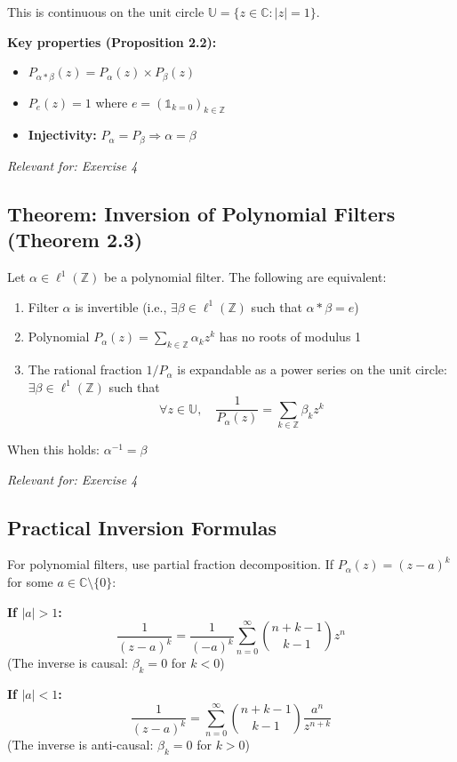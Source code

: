 \documentclass[a4paper, 12pt]{article}
\begin{document}
This is continuous on the unit circle $\mathbb{U} = \{z \in \mathbb{C}: |z|=1\}$.

\textbf{Key properties (Proposition 2.2):}
\begin{itemize}
\item $P_{\alpha*\beta}(z) = P_\alpha(z) \times P_\beta(z)$
\item $P_e(z) = 1$ where $e = (\mathbb{1}_{k=0})_{k \in \mathbb{Z}}$
\item \textbf{Injectivity:} $P_\alpha = P_\beta \Rightarrow \alpha = \beta$
\end{itemize}

\textit{Relevant for: Exercise 4}

\subsection{Theorem: Inversion of Polynomial Filters (Theorem 2.3)}
Let $\alpha \in \ell^1(\mathbb{Z})$ be a polynomial filter. The following are equivalent:
\begin{enumerate}
\item Filter $\alpha$ is invertible (i.e., $\exists \beta \in \ell^1(\mathbb{Z})$ such that $\alpha * \beta = e$)
\item Polynomial $P_\alpha(z) = \sum_{k \in \mathbb{Z}} \alpha_k z^k$ has no roots of modulus 1
\item The rational fraction $1/P_\alpha$ is expandable as a power series on the unit circle: $\exists \beta \in \ell^1(\mathbb{Z})$ such that
\[
\forall z \in \mathbb{U}, \quad \frac{1}{P_\alpha(z)} = \sum_{k \in \mathbb{Z}} \beta_k z^k
\]
\end{enumerate}

When this holds: $\alpha^{-1} = \beta$

\textit{Relevant for: Exercise 4}

\subsection{Practical Inversion Formulas}
For polynomial filters, use partial fraction decomposition. If $P_\alpha(z) = (z-a)^k$ for some $a \in \mathbb{C} \setminus \{0\}$:

\textbf{If $|a| > 1$:}
\[
\frac{1}{(z-a)^k} = \frac{1}{(-a)^k}\sum_{n=0}^\infty \binom{n+k-1}{k-1}z^n
\]
(The inverse is causal: $\beta_k = 0$ for $k < 0$)

\textbf{If $|a| < 1$:}
\[
\frac{1}{(z-a)^k} = \sum_{n=0}^\infty \binom{n+k-1}{k-1}\frac{a^n}{z^{n+k}}
\]
(The inverse is anti-causal: $\beta_k = 0$ for $k > 0$)
\end{document}
